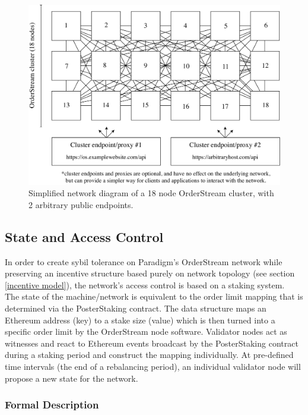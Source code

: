 \documentclass[9pt]{article}
\begin{document}
\begin{figure}[H]
    \centering
    \includegraphics[scale=0.4]{../figures/fig4.pdf}
    \caption{Simplified network diagram of a 18 node OrderStream cluster, with 2 arbitrary public endpoints. }
    \label{fig:fig4}
\end{figure}

\subsection{State and Access Control}\label{staking}

\noindent In order to create sybil tolerance on Paradigm’s OrderStream network while preserving an incentive structure based purely on network topology (see section \ref{incentive model}), the network’s access control is based on a staking system. \\

\noindent The state of the machine/network is equivalent to the order limit mapping that is determined via the PosterStaking contract. The data structure maps an Ethereum address (key) to a stake size (value) which is then turned into a specific order limit by the OrderStream node software. Validator nodes act as witnesses and react to Ethereum events broadcast by the PosterStaking contract during a staking period and construct the mapping individually. At pre-defined time intervals (the end of a rebalancing period), an individual validator node will propose a new state for the network. 

\subsubsection{Formal Description}
\end{document}

